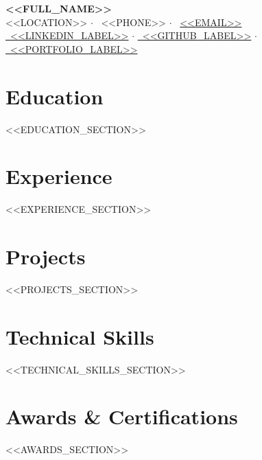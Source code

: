 \documentclass[a4paper,11pt]{article}
\begin{document}
\pagestyle{empty}

\begin{center}
    {\Huge \textbf{<<FULL_NAME>>}} \\ \vspace{6pt}
    \small \color{secondary}
    \faMapMarker* <<LOCATION>> \quad $\cdot$ \quad 
    \faPhone \ <<PHONE>> \quad $\cdot$ \quad 
    \faEnvelope \ \href{mailto:<<EMAIL>>}{<<EMAIL>>} \\ \vspace{4pt}
    \href{<<LINKEDIN_URL>>}{\faLinkedin \ <<LINKEDIN_LABEL>>} \quad $\cdot$ \quad
    \href{<<GITHUB_URL>>}{\faGithub \ <<GITHUB_LABEL>>} \quad $\cdot$ \quad
    \href{<<PORTFOLIO_URL>>}{\faGlobe \ <<PORTFOLIO_LABEL>>}
\end{center}
\vspace{6pt}

\section{Education}

<<EDUCATION_SECTION>>

\section{Experience}

<<EXPERIENCE_SECTION>>

\section{Projects}

<<PROJECTS_SECTION>>

\section{Technical Skills}
\vspace{2pt} 

<<TECHNICAL_SKILLS_SECTION>>

\section{Awards \& Certifications}
<<AWARDS_SECTION>>
\end{document}

